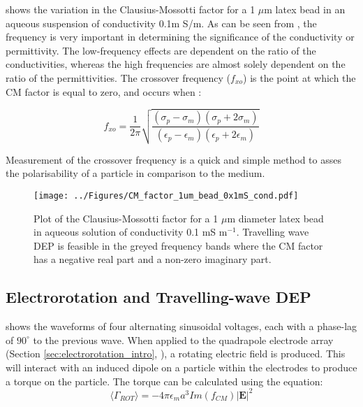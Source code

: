  shows the variation in the Clausius-Mossotti factor for a 1 $\mu$m latex bead in an aqueous suspension of conductivity 0.1m S/m. As can be seen from , the frequency is very important in determining the significance of the conductivity or permittivity. The low-frequency effects are dependent on the ratio of the conductivities, whereas the high frequencies are almost solely dependent on the ratio of the permittivities. The crossover frequency ($f_{xo}$) is the point at which the CM factor is equal to zero, and occurs when \citep{Jones:1986}:

\begin{equation}
 f_{xo} = \frac{1}{2 \pi} \sqrt{\frac{(\sigma_p - \sigma_m)(\sigma_p + 2 \sigma_m)}{(\epsilon_p - \epsilon_m)(\epsilon_p + 2 \epsilon_m)}}
\label{eqn:crossover_equation}
\end{equation}

Measurement of the crossover frequency is a quick and simple method to asses the polarisability of a particle in comparison to the medium.

\begin{figure}
 \centering
 \texttt{[image: ../Figures/CM\_factor\_1um\_bead\_0x1mS\_cond.pdf]}
 \caption[Plot of the Clausius-Mossotti factor for a 1 $\mu$m diameter latex bead in aqueous solution of conductivity 0.1 mS m$^{-1}$.]{Plot of the Clausius-Mossotti factor for a 1 $\mu$m diameter latex bead in aqueous solution of conductivity 0.1 mS m$^{-1}$. Travelling wave DEP is feasible in the greyed frequency bands where the CM factor has a negative real part and a non-zero imaginary part.}
 \label{fig:CM_factor_1um_bead_0x1mS_cond}
\end{figure}

\subsection{Electrorotation and Travelling-wave DEP}
\label{sec:electrorotation_and_travelling_wave}

 shows the waveforms of four alternating sinusoidal voltages, each with a phase-lag of $90^{\circ}$ to the previous wave. When applied to the quadrapole electrode array (Section \ref{sec:electrorotation_intro}, ), a rotating electric field is produced. This will interact with an induced dipole on a particle within the electrodes to produce a torque on the particle. The torque can be calculated using the equation:
\nopagebreak[3]
\begin{equation}
 \langle \Gamma_{ROT} \rangle = -4 \pi \epsilon_{m} a^{3} Im(f_{CM}) |\textbf{E}|^{2}
\label{eqn:ROT_torque}
\end{equation}


